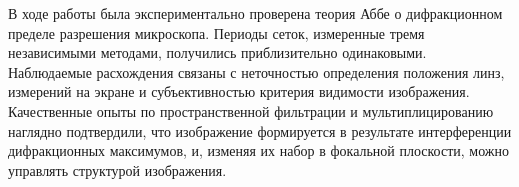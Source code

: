 \documentclass[a4paper,12pt]{article} %
\begin{document}
В ходе работы была экспериментально проверена теория Аббе о дифракционном пределе разрешения микроскопа. Периоды сеток, измеренные тремя независимыми методами, получились приблизительно одинаковыми. Наблюдаемые расхождения связаны с неточностью определения положения линз, измерений на экране и субъективностью критерия видимости изображения. Качественные опыты по пространственной фильтрации и мультиплицированию наглядно подтвердили, что изображение формируется в результате интерференции дифракционных максимумов, и, изменяя их набор в фокальной плоскости, можно управлять структурой изображения.
\end{document}
